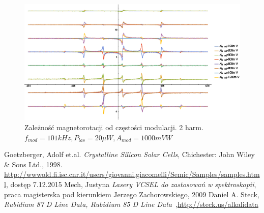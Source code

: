 \documentclass[a4paper,10pt]{article}
\begin{document}
\begin{figure}[h!]
\centering
 \includegraphics[width=\textwidth]{panoramy_2H_odam.eps}
 \caption{Zależność magnetorotacji od częstości modulacji. 2 harm. $f_{mod}=101kHz, P_{las}=20 \mu W, A_{mod}=1000mV W$}
 \label{fig:panodam2}
\end{figure}



\begin{thebibliography}{99}
 Goetzberger, Adolf et.al. \emph{Crystalline Silicon Solar Cells}, Chichester: John Wiley \& Sons Ltd., 1998.
 \url{http://wwwold.fi.isc.cnr.it/users/giovanni.giacomelli/Semic/Samples/samples.html}, dostęp 7.12.2015
  Mech, Justyna \emph{Lasery VCSEL do zastosowań w spektroskopii}, praca magisterska pod kierunkiem Jerzego Zachorowskiego, 2009
 Daniel A. Steck, \emph{Rubidium 87 D Line Data, Rubidium 85 D Line Data}~,\url{http://steck.us/alkalidata}

\end{thebibliography}
\end{document}
